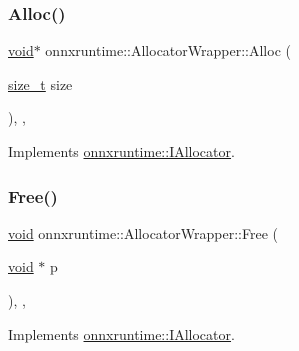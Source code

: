 \subsubsection{\texorpdfstring{Alloc()}{Alloc()}}
{\footnotesize\ttfamily \mbox{\hyperlink{mlasi_8h_a88f941d423cb2a819b70a1358982b1a6}{void}}$\ast$ onnxruntime\+::\+Allocator\+Wrapper\+::\+Alloc (\begin{DoxyParamCaption}\item[{\mbox{\hyperlink{mlasi_8h_a503efbc1c6e50825320ad909366b78ab}{size\+\_\+t}}}]{size }\end{DoxyParamCaption})\hspace{0.3cm}{\ttfamily [inline]}, {\ttfamily [override]}, {\ttfamily [virtual]}}



Implements \mbox{\hyperlink{classonnxruntime_1_1IAllocator_a765590df724d3e7805c1dddbfe290b11}{onnxruntime\+::\+I\+Allocator}}.

\mbox{\label{classonnxruntime_1_1AllocatorWrapper_ac41adbaba7d92b14697b271050d0cab2}} 
\subsubsection{\texorpdfstring{Free()}{Free()}}
{\footnotesize\ttfamily \mbox{\hyperlink{mlasi_8h_a88f941d423cb2a819b70a1358982b1a6}{void}} onnxruntime\+::\+Allocator\+Wrapper\+::\+Free (\begin{DoxyParamCaption}\item[{\mbox{\hyperlink{mlasi_8h_a88f941d423cb2a819b70a1358982b1a6}{void}} $\ast$}]{p }\end{DoxyParamCaption})\hspace{0.3cm}{\ttfamily [inline]}, {\ttfamily [override]}, {\ttfamily [virtual]}}



Implements \mbox{\hyperlink{classonnxruntime_1_1IAllocator_aeab273380d08b613b584c9e50deeb5f9}{onnxruntime\+::\+I\+Allocator}}.

\mbox{\label{classonnxruntime_1_1AllocatorWrapper_a4eca2bcda00b9c970c3e8fd610d8f7b0}} 
